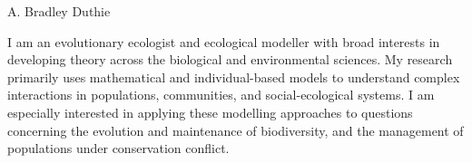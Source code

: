\documentclass[letterpaper]{article}
\def\name{A. Bradley Duthie}
\begin{document}
\thispagestyle{specialfooter}


{\Huge \name}

\hrulefill

\vspace{0.03in}

I am an evolutionary ecologist and ecological modeller with broad interests in developing theory across the biological and environmental sciences. My research primarily uses mathematical and individual-based models to understand complex interactions in populations, communities, and social-ecological systems. I am especially interested in applying these modelling approaches to questions concerning the evolution and maintenance of biodiversity, and the management of populations under conservation conflict.




\hrulefill

\vspace{0.16in}
\end{document}
